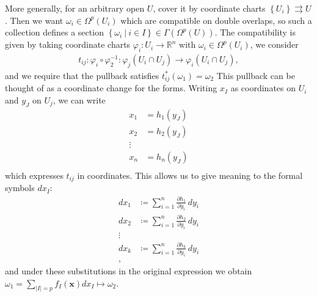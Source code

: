 \begin{remark}

More generally, for an arbitrary open \(U\), cover it by coordinate
charts \(\left\{{ U_i }\right\} \rightrightarrows U\). Then we want
\(\omega_i \in \Omega^p(U_i)\) which are compatible on double overlaps,
so such a collection defines a section
\(\left\{{ \omega_i {~\mathrel{\Big|}~}i\in I }\right\} \in \Gamma( \Omega^p(U) )\).
The compatibility is given by taking coordinate charts
\(\varphi_i: U_i \to {\mathbb{R}}^n\) with
\(\omega_i \in \Omega^p(U_i)\), we consider
\begin{align*}
t_{ij}: \varphi_i \circ \varphi_2 ^{-1} : \varphi_j(U_i \cap U_j) \to \varphi_i( U_i \cap U_j)
,\end{align*}
and we require that the pullback satisfies
\(t_{ij}^*(\omega_1) = \omega_2\) This pullback can be thought of as a
coordinate change for the forms. Writing \(x_I\) as coordinates on
\(U_i\) and \(y_J\) on \(U_j\), we can write
\begin{align*}
x_1 &= h_1(y_J) \\
x_2 &= h_2(y_J) \\
\vdots& \\
x_n &= h_n(y_J) \\
\end{align*}
which expresses \(t_{ij}\) in coordinates. This allows us to give
meaning to the formal symbols \(dx_I\):
\begin{align*}
dx_1 &\coloneqq\sum_{i=1}^n {\frac{\partial h_1}{\partial y_i}\,} dy_i \\
dx_2 &\coloneqq\sum_{i=1}^n {\frac{\partial h_2}{\partial y_i}\,} dy_i \\
\vdots& \\
dx_k &\coloneqq\sum_{i=1}^n {\frac{\partial h_k}{\partial y_i}\,} dy_i \\
,\end{align*}
and under these substitutions in the original expression we obtain
\(\omega_1 = \sum_{{\left\lvert {I} \right\rvert} = p} f_I(\mathbf{x}) dx_I \mapsto \omega_2\).

\end{remark}

